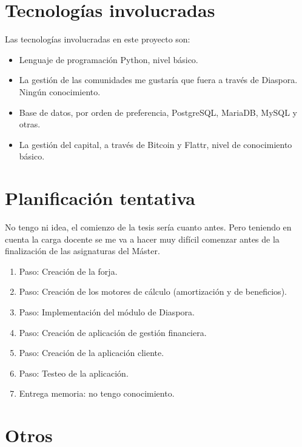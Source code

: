 \documentclass[10pt]{article}
\begin{document}
\section{Tecnologías involucradas}

Las tecnologías involucradas en este proyecto son:

\begin{itemize}
  \item Lenguaje de programación Python, nivel básico.
  \item La gestión de las comunidades me gustaría que fuera a través de Diaspora. Ningún conocimiento.
  \item Base de datos, por orden de preferencia, PostgreSQL, MariaDB, MySQL y otras.
  \item La gestión del capital, a través de Bitcoin y Flattr, nivel de conocimiento básico.
\end{itemize}

\section{Planificación tentativa}

No tengo ni idea, el comienzo de la tesis sería cuanto antes. Pero teniendo en cuenta la carga docente se me va a hacer muy difícil comenzar antes de la finalización de las asignaturas del Máster.

\begin{enumerate}
  \item Paso: Creación de la forja.
  \item Paso: Creación de los motores de cálculo (amortización y de beneficios).
  \item Paso: Implementación del módulo de Diaspora.
  \item Paso: Creación de aplicación de gestión financiera. 
  \item Paso: Creación de la aplicación cliente.
  \item Paso: Testeo de la aplicación.
  \item Entrega memoria: no tengo conocimiento.
\end{enumerate}

\section{Otros}

\end{document}
